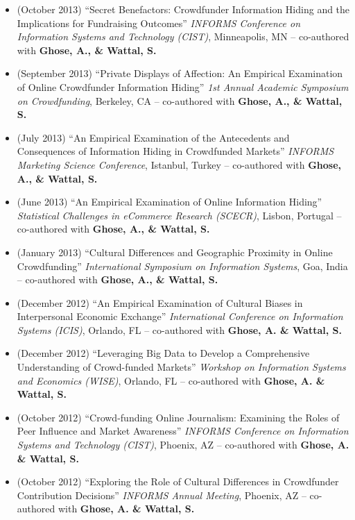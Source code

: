 \documentclass[10.5pt,letterpaper,sans]{moderncv}        %
\begin{document}
\begin{itemize}
\item (October 2013) ``Secret Benefactors: Crowdfunder Information Hiding and the Implications for Fundraising Outcomes'' \textit{INFORMS Conference on Information Systems and Technology (CIST)}, Minneapolis, MN -- co-authored with \textbf{Ghose, A., \& Wattal, S.}

\item (September 2013) ``Private Displays of Affection: An Empirical Examination of Online Crowdfunder Information Hiding'' \textit{1st Annual Academic Symposium on Crowdfunding}, Berkeley, CA -- co-authored with \textbf{Ghose, A., \& Wattal, S.}

\item (July 2013) ``An Empirical Examination of the Antecedents and Consequences of Information Hiding in Crowdfunded Markets'' \textit{INFORMS Marketing Science Conference}, Istanbul, Turkey -- co-authored with \textbf{Ghose, A., \& Wattal, S.}

\item (June 2013) ``An Empirical Examination of Online Information Hiding'' \textit{Statistical Challenges in eCommerce Research (SCECR)}, Lisbon, Portugal -- co-authored with \textbf{Ghose, A., \& Wattal, S.}

\item (January 2013) ``Cultural Differences and Geographic Proximity in Online Crowdfunding'' \textit{International Symposium on Information Systems}, Goa, India -- co-authored with \textbf{Ghose, A., \& Wattal, S.}

\item (December 2012) ``An Empirical Examination of Cultural Biases in Interpersonal Economic Exchange'' \textit{International Conference on Information Systems (ICIS)}, Orlando, FL -- co-authored with \textbf{Ghose, A. \& Wattal, S.}

\item (December 2012) ``Leveraging Big Data to Develop a Comprehensive Understanding of Crowd-funded Markets'' \textit{Workshop on Information Systems and Economics (WISE)}, Orlando, FL -- co-authored with \textbf{Ghose, A. \& Wattal, S.}

\item (October 2012) ``Crowd-funding Online Journalism: Examining the Roles of Peer Influence and Market Awareness'' \textit{INFORMS Conference on Information Systems and Technology (CIST)}, Phoenix, AZ -- co-authored with \textbf{Ghose, A. \& Wattal, S.}

\item (October 2012) ``Exploring the Role of Cultural Differences in Crowdfunder Contribution Decisions'' \textit{INFORMS Annual Meeting}, Phoenix, AZ -- co-authored with \textbf{Ghose, A. \& Wattal, S.}


\end{itemize}
\end{document}
